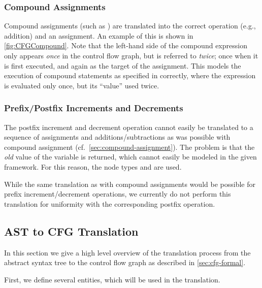\subsubsection{Compound Assignments}
\label{sec:compound-assignment}

Compound assignments (such as ) are translated into the correct operation
(e.g., addition) and an assignment. An example of this is shown in \autoref{fig:CFGCompound}.
Note that the left-hand side of the compound expression only appears \emph{once} in the
control flow graph, but is referred to \emph{twice}; once when it is first executed,
and again as the target of the assignment. This models the execution of compound statements
as specified in  correctly, where the expression is evaluated only once, but
its ``value'' used twice.


\subsubsection{Prefix/Postfix Increments and Decrements}

The postfix increment and decrement operation cannot easily be translated to a sequence of
assignments and additions/subtractions as was possible with compound assignment (cf.\ \autoref{sec:compound-assignment}).
The problem is that the \emph{old} value of the variable is returned, which cannot easily be modeled
in the given framework. For this reason, the node types  and
 are used.

While the same translation as with compound assignments would be possible for
prefix increment/decrement operations, we currently do not perform this translation for uniformity with
the corresponding postfix operation.




\subsection{AST to CFG Translation}

In this section we give a high level overview of the translation process from the
abstract syntax tree to the control flow graph as described in \autoref{sec:cfg-formal}.

First, we define several entities, which will be used in the translation.

